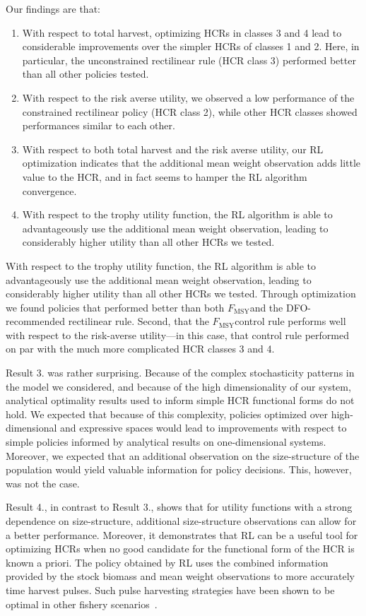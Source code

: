 \documentclass[floatfix,nofootinbib,longbibliography,notitlepage]{revtex4-2}
\def\textfmsy{$F_{\text{MSY}}$}
\begin{document}
Our findings are that:
\begin{enumerate}
\item With respect to total harvest, optimizing HCRs in classes 3 and 4 lead to considerable improvements over the simpler HCRs of classes 1 and 2. Here, in particular, the unconstrained rectilinear rule (HCR class 3) performed better than all other policies tested.
\item With respect to the risk averse utility, we observed a low performance of the constrained rectilinear policy (HCR class 2), while other HCR classes showed performances similar to each other.
\item With respect to both total harvest and the risk averse utility, our RL optimization indicates that the additional mean weight observation adds little value to the HCR, and in fact seems to hamper the RL algorithm convergence. 
\item With respect to the trophy utility function, the RL algorithm is able to advantageously use the additional mean weight observation, leading to considerably higher utility than all other HCRs we tested. 
\end{enumerate}

With respect to the trophy utility function, the RL algorithm is able to advantageously use the additional mean weight observation, leading to considerably higher utility than all other HCRs we tested. 
Through optimization we found policies that performed better than both \textfmsy and the DFO-recommended rectilinear rule. 
Second, that the \textfmsy control rule performs well with respect to the risk-averse utility—in this case, that control rule performed on par with the much more complicated HCR classes 3 and 4. 

Result 3. was rather surprising. 
Because of the complex stochasticity patterns in the model we considered, and because of the high dimensionality of our system, analytical optimality results used to inform simple HCR functional forms do not hold. 
We expected that because of this complexity, policies optimized over high-dimensional and expressive spaces would lead to improvements with respect to simple policies informed by analytical results on one-dimensional systems. 
Moreover, we expected that an additional observation on the size-structure of the population would yield valuable information for policy decisions. 
This, however, was not the case.

Result 4., in contrast to Result 3., shows that for utility functions with a strong dependence on size-structure, additional size-structure observations can allow for a better performance. 
Moreover, it demonstrates that RL can be a useful tool for optimizing HCRs when no good candidate for the functional form of the HCR is known a priori. 
The policy obtained by RL uses the combined information provided by the stock biomass and mean weight observations to more accurately time harvest pulses. Such pulse harvesting strategies have been shown to be optimal in other fishery scenarios~\cite{botsford1981,darocha2013}.
\end{document}
